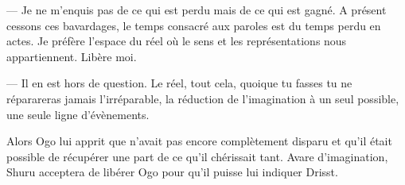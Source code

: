 --- Je ne m'enquis pas de ce qui est perdu mais de ce qui est gagné. A présent cessons ces bavardages, le temps consacré aux paroles est du temps perdu en actes. Je préfère l'espace du réel où le sens et les représentations nous appartiennent. Libère moi.

--- Il en est hors de question. Le réel, tout cela, quoique tu fasses tu ne réparareras jamais l'irréparable, la réduction de l'imagination à un seul possible, une seule ligne d'évènements.

Alors Ogo lui apprit que \Mey n'avait pas encore complètement disparu et qu'il était possible de récupérer une part de ce qu'il chérissait tant. Avare d'imagination, Shuru acceptera de libérer Ogo pour qu'il puisse lui indiquer Drisst.  
   

